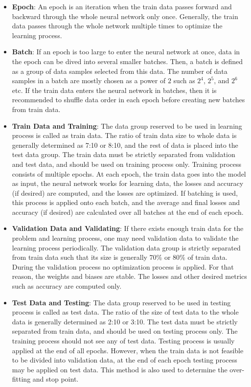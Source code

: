 \begin{itemize}
\item \textbf{Epoch}: An epoch is an iteration when the train data passes forward and backward through the whole neural network only once. Generally, the train data passes through the whole network multiple times to optimize the learning process.

\item \textbf{Batch}: If an epoch is too large to enter the neural network at once, data in the epoch can be dived into several smaller batches. Then, a batch is defined as a group of data samples selected from this data. The number of data samples in a batch are mostly chosen as a power of $2$ such as $2^4$, $2^5$, and  $2^6$ etc. If the train data enters the neural network in batches, then it is recommended to shuffle data order in each epoch before creating new batches from train data.
  
\item \textbf{Train Data and Training}: The data group reserved to be used in learning process is called as train data. The ratio of train data size to whole data is generally determined as 7:10 or 8:10, and the rest of data is placed into the test data group. The train data must be strictly separated from validation and test data, and should be used on training process only. Training process consists of multiple epochs. At each epoch, the train data goes into the model as input, the neural network works for learning data, the losses and accuracy (if desired) are computed, and the losses are optimized. If batching is used, this process is applied onto each batch, and the average and final losses and accuracy (if desired) are calculated over all batches at the end of each epoch.
  
\item \textbf{Validation Data and Validating}: If there exists enough train data for the problem and learning process, one may need validation data to validate the learning process periodically. The validation data group is strictly separated from train data such that its size is generally 70\% or 80\% of train data. During the validation process no optimization process is applied. For that reason, the weights and biases are stable. The losses and other desired metrics such as accuracy are computed only.
  
\item \textbf{Test Data and Testing}: The data group reserved to be used in testing process is called as test data. The ratio of the size of test data to the whole data is generally determined as 2:10 or 3:10. The test data must be strictly separated from train data, and should be used on testing process only. The training process should not see any of test data. Testing process is usually applied at the end of all epochs. However, when the train data is not feasible to be divided into validation data, at the end of each epoch testing process may be applied on test data. This method is also used to determine the over-fitting and stop point.
    

\end{itemize}
